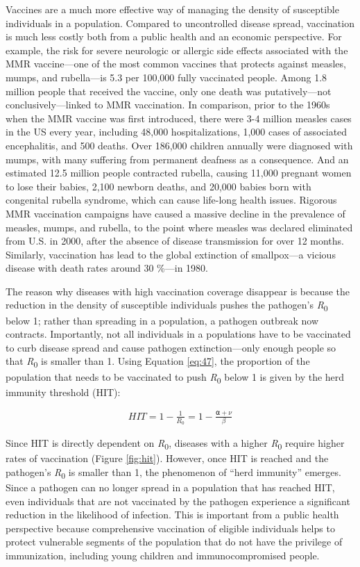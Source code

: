\documentclass[
]{book}
\begin{document}
Vaccines are a much more effective way of managing the density of susceptible individuals in a population. Compared to uncontrolled disease spread, vaccination is much less costly both from a public health and an economic perspective. For example, the risk for severe neurologic or allergic side effects associated with the MMR vaccine---one of the most common vaccines that protects against measles, mumps, and rubella---is 5.3 per 100,000 fully vaccinated people. Among 1.8 million people that received the vaccine, only one death was putatively---not conclusively---linked to MMR vaccination. In comparison, prior to the 1960s when the MMR vaccine was first introduced, there were 3-4 million measles cases in the US every year, including 48,000 hospitalizations, 1,000 cases of associated encephalitis, and 500 deaths. Over 186,000 children annually were diagnosed with mumps, with many suffering from permanent deafness as a consequence. And an estimated 12.5 million people contracted rubella, causing 11,000 pregnant women to lose their babies, 2,100 newborn deaths, and 20,000 babies born with congenital rubella syndrome, which can cause life-long health issues. Rigorous MMR vaccination campaigns have caused a massive decline in the prevalence of measles, mumps, and rubella, to the point where measles was declared eliminated from U.S. in 2000, after the absence of disease transmission for over 12 months. Similarly, vaccination has lead to the global extinction of smallpox---a vicious disease with death rates around 30 \%---in 1980.

The reason why diseases with high vaccination coverage disappear is because the reduction in the density of susceptible individuals pushes the pathogen's \emph{R}\textsubscript{0} below 1; rather than spreading in a population, a pathogen outbreak now contracts. Importantly, not all individuals in a populations have to be vaccinated to curb disease spread and cause pathogen extinction---only enough people so that \emph{R}\textsubscript{0} is smaller than 1. Using Equation \eqref{eq:47}, the proportion of the population that needs to be vaccinated to push \emph{R}\textsubscript{0} below 1 is given by the herd immunity threshold (HIT):

\begin{align} 
HIT=1-\frac{1}{R_0}=1-\frac{⍺+ν}{β} \label{eq:47}
\end{align}

Since HIT is directly dependent on \emph{R}\textsubscript{0}, diseases with a higher \emph{R}\textsubscript{0} require higher rates of vaccination (Figure \ref{fig:hit}). However, once HIT is reached and the pathogen's \emph{R}\textsubscript{0} is smaller than 1, the phenomenon of ``herd immunity'' emerges. Since a pathogen can no longer spread in a population that has reached HIT, even individuals that are not vaccinated by the pathogen experience a significant reduction in the likelihood of infection. This is important from a public health perspective because comprehensive vaccination of eligible individuals helps to protect vulnerable segments of the population that do not have the privilege of immunization, including young children and immunocompromised people.
\end{document}
